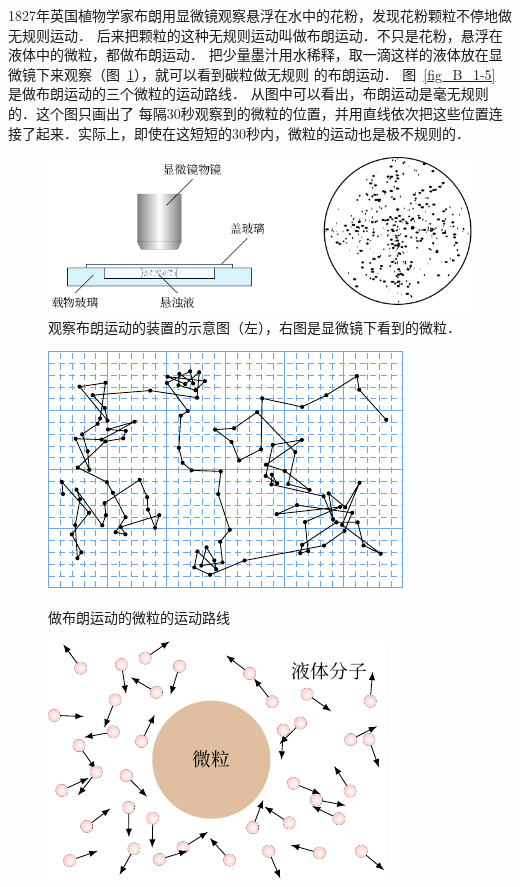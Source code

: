 1827年英国植物学家布朗用显微镜观察悬浮在水中的花粉，发现花粉颗粒不停地做无规则运动．
后来把颗粒的这种无规则运动叫做布朗运动．不只是花粉，悬浮在液体中的微粒，都做布朗运动．
把少量墨汁用水稀释，取一滴这样的液体放在显微镜下来观察（图~\ref{fig_B_1-4}），就可以看到碳粒做无规则
的布朗运动．
图~\ref{fig_B_1-5} 是做布朗运动的三个微粒的运动路线．
从图中可以看出，布朗运动是毫无规则的．这个图只画出了
每隔30秒观察到的微粒的位置，并用直线依次把这些位置连接了起来．实际上，即使在这短短的30秒内，微粒的运动也是极不规则的．

\begin{figure}[htbp]
    \centering
    \includegraphics{fig/B/1-4.pdf}
    \caption{观察布朗运动的装置的示意图（左），右图是显微镜下看到的微粒．}\label{fig_B_1-4}
\end{figure}

\begin{figure}[htbp]
    \centering
    \begin{minipage}[t]{0.48\textwidth}
        \centering
        \includegraphics{fig/B/1-5.pdf}
        \caption{做布朗运动的微粒的运动路线}\label{fig_B_1-5}
    \end{minipage}
    \begin{minipage}[t]{0.48\textwidth}
        \centering
        \includegraphics{fig/B/1-6.pdf}
        \caption{}\label{fig_B_1-6}
    \end{minipage}
\end{figure}






